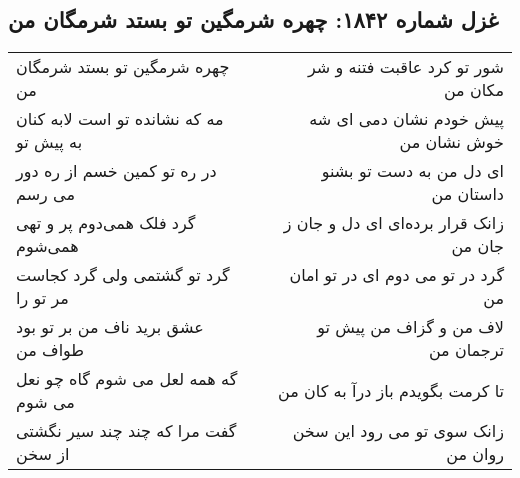 \begin{center}
\section*{غزل شماره ۱۸۴۲: چهره شرمگین تو بستد شرمگان من}
\label{sec:1842}
\begin{longtable}{l p{0.5cm} r}
چهره شرمگین تو بستد شرمگان من
&&
شور تو کرد عاقبت فتنه و شر مکان من
\\
مه که نشانده تو است لابه کنان به پیش تو
&&
پیش خودم نشان دمی ای شه خوش نشان من
\\
در ره تو کمین خسم از ره دور می رسم
&&
ای دل من به دست تو بشنو داستان من
\\
گرد فلک همی‌دوم پر و تهی همی‌شوم
&&
زانک قرار برده‌ای ای دل و جان ز جان من
\\
گرد تو گشتمی ولی گرد کجاست مر تو را
&&
گرد در تو می دوم ای در تو امان من
\\
عشق برید ناف من بر تو بود طواف من
&&
لاف من و گزاف من پیش تو ترجمان من
\\
گه همه لعل می شوم گاه چو نعل می شوم
&&
تا کرمت بگویدم باز درآ به کان من
\\
گفت مرا که چند چند سیر نگشتی از سخن
&&
زانک سوی تو می رود این سخن روان من
\\
\end{longtable}
\end{center}
